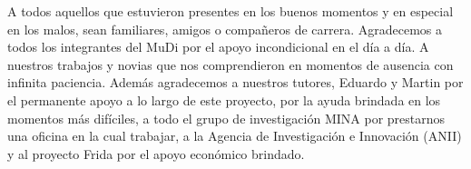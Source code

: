 
\begin{acknowledgements}      
A todos aquellos que estuvieron presentes en los buenos momentos y en especial en los malos, sean familiares, amigos o compa\~neros de carrera. Agradecemos a todos los integrantes del MuDi por el apoyo incondicional en el día a día. A nuestros trabajos y novias que nos comprendieron en momentos de ausencia con infinita paciencia. Adem\'as agradecemos a nuestros tutores, Eduardo y Martin por el permanente apoyo a lo largo de este proyecto, por la ayuda brindada en los momentos m\'as difíciles, a todo el grupo de investigaci\'on MINA por prestarnos una oficina en la cual trabajar, a la Agencia de Investigaci\'on e Innovaci\'on (ANII) y al proyecto Frida por el apoyo económico brindado.


\end{acknowledgements}
